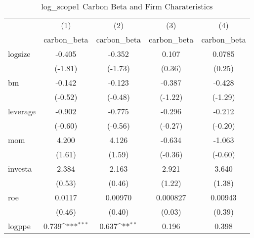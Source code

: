 \begin{table}[htbp]\centering
\def\sym#1{\ifmmode^{#1}\else\(^{#1}\)\fi}
\caption{log\_scope1 Carbon Beta and Firm Charateristics}
\begin{tabular}{l*{4}{c}}
\hline\hline
                    &\multicolumn{1}{c}{(1)}&\multicolumn{1}{c}{(2)}&\multicolumn{1}{c}{(3)}&\multicolumn{1}{c}{(4)}\\
                    &\multicolumn{1}{c}{carbon\_beta}&\multicolumn{1}{c}{carbon\_beta}&\multicolumn{1}{c}{carbon\_beta}&\multicolumn{1}{c}{carbon\_beta}\\
\hline
logsize             &      -0.405         &      -0.352         &       0.107         &      0.0785         \\
                    &     (-1.81)         &     (-1.73)         &      (0.36)         &      (0.25)         \\
[1em]
bm                  &      -0.142         &      -0.123         &      -0.387         &      -0.428         \\
                    &     (-0.52)         &     (-0.48)         &     (-1.22)         &     (-1.29)         \\
[1em]
leverage            &      -0.902         &      -0.775         &      -0.296         &      -0.212         \\
                    &     (-0.60)         &     (-0.56)         &     (-0.27)         &     (-0.20)         \\
[1em]
mom                 &       4.200         &       4.126         &      -0.634         &      -1.063         \\
                    &      (1.61)         &      (1.59)         &     (-0.36)         &     (-0.60)         \\
[1em]
investa             &       2.384         &       2.163         &       2.921         &       3.640         \\
                    &      (0.53)         &      (0.46)         &      (1.22)         &      (1.38)         \\
[1em]
roe                 &      0.0117         &     0.00970         &    0.000827         &     0.00943         \\
                    &      (0.46)         &      (0.40)         &      (0.03)         &      (0.39)         \\
[1em]
logppe              &       0.739\sym{***}&       0.637\sym{**} &       0.196         &       0.398         \\

\end{tabular}
\end{table}
